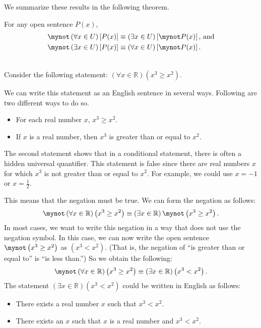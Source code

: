 We summarize these results in the following theorem.
\begin{theorem}\label{T:negations}
For any open sentence  $P( x )$,
\[
\begin{aligned}
  \mynot  \left( {\forall x} \in U \right)\left[ {P( x )} \right] &\equiv \left( {\exists x} \in U \right)\left[ {\mynot  P( x )} \right]\text{, and} \\ 
  \mynot  \left( {\exists x} \in U \right)\left[ {P( x )} \right] &\equiv \left( {\forall x} \in U \right)\left[ {\mynot  P( x )} \right]. \\ 
\end{aligned}
\] 
\end{theorem}
\hbreak
%
\begin{example}\label{E:negations} \hfill \\
Consider the following statement:  $\left( {\forall x \in \mathbb{R}} \right)\left( {x^3  \geq x^2 } \right)$.

We can write this statement as an English sentence in several ways.  Following are two different ways to do so.
\begin{itemize}
  \item For each real number $x$, $x^3  \geq x^2 $.
  \item If  $x$  is a real number, then  $x^3 $ is greater than or equal to  $x^2 $.
\end{itemize}
The second statement shows that in a conditional statement, there is often a hidden universal quantifier.  This statement is false since there are real numbers  $x$  for which  $x^3 $ is not greater than or equal to  $x^2 $. For example, we could use  $x =  - 1$ or  $x = \frac{1}{2}$.

This means that the negation must be true.  We can form the negation as follows:
\[
\mynot  \left( {\forall x \in \mathbb{R}} \right)\left( {x^3  \geq x^2 } \right) \equiv \left( {\exists x \in \mathbb{R}} \right)\mynot  \left( {x^3  \geq x^2 } \right).
\]
In most cases, we want to write this negation in a way that does not use the negation symbol.  In this case, we can now write the open sentence $\mynot  \left( {x^3  \geq x^2 } \right)$ as  $\left( {x^3  < x^2 } \right)$.  (That is, the negation of ``is greater than or equal to'' is ``is less than.'')  So we obtain the following:
\[
\mynot  \left( {\forall x \in \mathbb{R}} \right)\left( {x^3  \geq x^2 } \right) \equiv \left( {\exists x \in \mathbb{R}} \right)\left( {x^3  < x^2 } \right).
\]
The statement $\left( {\exists x \in \mathbb{R}} \right)\left( {x^3  < x^2 } \right)$
could be written in English as follows:
\begin{itemize}
  \item There exists a real number  $x$  such that  $x^3  < x^2 $.
  \item There exists an  $x$  such that  $x$  is a real number and  $x^3  < x^2 $.
\end{itemize}
%
\end{example}
